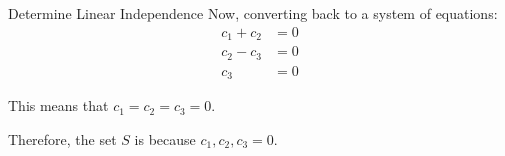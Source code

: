 \begin{example}{Determine Linear Independence}
  Now, converting back to a system of equations:
  \begin{align*}
    c_{1} + c_{2} &= 0 \\
    c_{2} - c_{3} &= 0 \\
    c_{3} &= 0
  \end{align*}

  This means that $c_{1} = c_{2} = c_{3} = 0$.

  Therefore, the set $S$ is  because $c_{1}, c_{2}, c_{3} = 0$.
\end{example}

